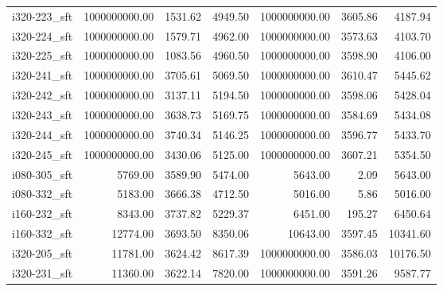 \begin{tabular}{lrrrrrr}
i320-223\_sft &         1000000000.00 &                   1531.62 &             4949.50 &      1000000000.00 &                3605.86 &          4187.94 \\
i320-224\_sft &         1000000000.00 &                   1579.71 &             4962.00 &      1000000000.00 &                3573.63 &          4103.70 \\
i320-225\_sft &         1000000000.00 &                   1083.56 &             4960.50 &      1000000000.00 &                3598.90 &          4106.00 \\
i320-241\_sft &         1000000000.00 &                   3705.61 &             5069.50 &      1000000000.00 &                3610.47 &          5445.62 \\
i320-242\_sft &         1000000000.00 &                   3137.11 &             5194.50 &      1000000000.00 &                3598.06 &          5428.04 \\
i320-243\_sft &         1000000000.00 &                   3638.73 &             5169.75 &      1000000000.00 &                3584.69 &          5434.08 \\
i320-244\_sft &         1000000000.00 &                   3740.34 &             5146.25 &      1000000000.00 &                3596.77 &          5433.70 \\
i320-245\_sft &         1000000000.00 &                   3430.06 &             5125.00 &      1000000000.00 &                3607.21 &          5354.50 \\
i080-305\_sft &               5769.00 &                   3589.90 &             5474.00 &            5643.00 &                   2.09 &          5643.00 \\
i080-332\_sft &               5183.00 &                   3666.38 &             4712.50 &            5016.00 &                   5.86 &          5016.00 \\
i160-232\_sft &               8343.00 &                   3737.82 &             5229.37 &            6451.00 &                 195.27 &          6450.64 \\
i160-332\_sft &              12774.00 &                   3693.50 &             8350.06 &           10643.00 &                3597.45 &         10341.60 \\
i320-205\_sft &              11781.00 &                   3624.42 &             8617.39 &      1000000000.00 &                3586.03 &         10176.50 \\
i320-231\_sft &              11360.00 &                   3622.14 &             7820.00 &      1000000000.00 &                3591.26 &          9587.77 \\

\end{tabular}
